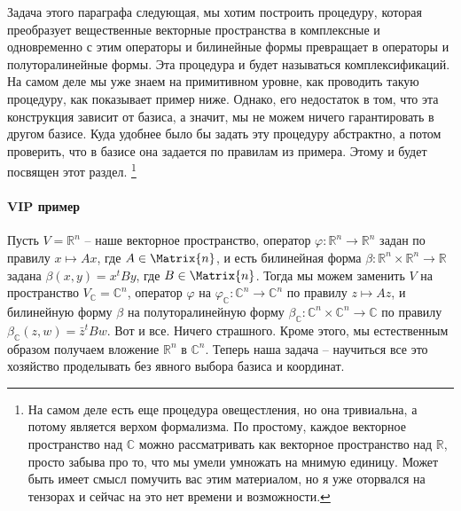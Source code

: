 Задача этого параграфа следующая, мы хотим построить процедуру, которая преобразует вещественные векторные пространства в комплексные и одновременно с этим операторы и билинейные формы превращает в операторы и полуторалинейные формы.
Эта процедура и будет называться комплексификаций.
На самом деле мы уже знаем на примитивном уровне, как проводить такую процедуру, как показывает пример ниже.
Однако, его недостаток в том, что эта конструкция зависит от базиса, а значит, мы не можем ничего гарантировать в другом базисе.
Куда удобнее было бы задать эту процедуру абстрактно, а потом проверить, что в базисе она задается по правилам из примера.
Этому и будет посвящен этот раздел.%
\footnote{На самом деле есть еще процедура овещестления, но она тривиальна, а потому является верхом формализма.
По простому, каждое векторное пространство над $\mathbb C$ можно рассматривать как векторное пространство над $\mathbb R$, просто забыва про то, что мы умели умножать на мнимую единицу.
Может быть имеет смысл помучить вас этим материалом, но я уже оторвался на тензорах и сейчас на это нет времени и возможности.}

\paragraph{VIP пример}

Пусть $V = \mathbb R^n$ -- наше векторное пространство, оператор $\varphi \colon \mathbb R^n\to \mathbb R^n$ задан по правилу $x \mapsto Ax$, где $A\in \Matrix{n}$, и есть билинейная форма $\beta \colon \mathbb R^n\times \mathbb R^n\to \mathbb R$ задана $\beta(x,y) = x^t By$, где $B\in \Matrix{n}$.
Тогда мы можем заменить $V$ на пространство $V_{\mathbb C} = \mathbb C^n$, оператор $\varphi$ на $\varphi_{\mathbb C}\colon \mathbb C^n \to \mathbb C^n$ по правилу $z\mapsto Az$, и билинейную форму $\beta$ на полуторалинейную форму $\beta_{\mathbb C}\colon \mathbb C^n \times \mathbb C^n \to \mathbb C$ по правилу $\beta_{\mathbb C}(z, w)= \bar z^t B w$.
Вот и все.
Ничего страшного.
Кроме этого, мы естественным образом получаем вложение $\mathbb R^n$ в $\mathbb C^n$.
Теперь наша задача -- научиться все это хозяйство проделывать без явного выбора базиса и координат.

